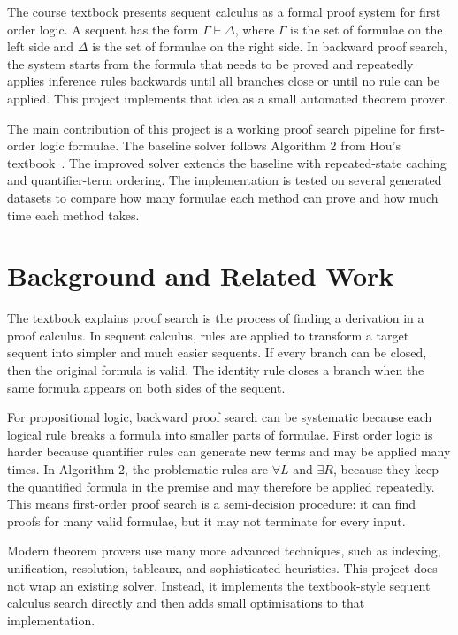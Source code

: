 \documentclass[runningheads]{llncs}
\begin{document}
The course textbook presents sequent calculus as a formal proof system for first order logic. A sequent has the form $\Gamma \vdash \Delta$, where $\Gamma$ is the set of formulae on the left side and $\Delta$ is the set of formulae on the right side. In backward proof search, the system starts from the formula that needs to be proved and repeatedly applies inference rules backwards until all branches close or until no rule can be applied. This project implements that idea as a small automated theorem prover.

The main contribution of this project is a working proof search pipeline for first-order logic formulae. The baseline solver follows Algorithm 2 from Hou's textbook~\cite{hou2021}. The improved solver extends the baseline with repeated-state caching and quantifier-term ordering. The implementation is tested on several generated datasets to compare how many formulae each method can prove and how much time each method takes.

\section{Background and Related Work}

The textbook explains proof search is the process of finding a derivation in a proof calculus. In sequent calculus, rules are applied to transform a target sequent into simpler and much easier sequents. If every branch can be closed, then the original formula is valid. The identity rule closes a branch when the same formula appears on both sides of the sequent.

For propositional logic, backward proof search can be systematic because each logical rule breaks a formula into smaller parts of formulae. First order logic is harder because quantifier rules can generate new terms and may be applied many times. In Algorithm 2, the problematic rules are $\forall L$ and $\exists R$, because they keep the quantified formula in the premise and may therefore be applied repeatedly. This means first-order proof search is a semi-decision procedure: it can find proofs for many valid formulae, but it may not terminate for every input.

Modern theorem provers use many more advanced techniques, such as indexing, unification, resolution, tableaux, and sophisticated heuristics. This project does not wrap an existing solver. Instead, it implements the textbook-style sequent calculus search directly and then adds small optimisations to that implementation.
\end{document}
